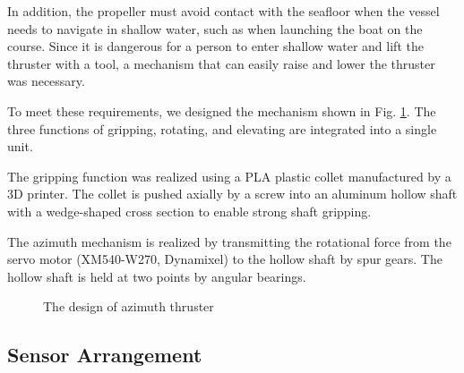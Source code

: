 \documentclass[lettersize,journal]{IEEEtran}
\begin{document}
In addition, the propeller must avoid contact with the seafloor when the vessel needs to navigate in shallow water, such as when launching the boat on the course. Since it is dangerous for a person to enter shallow water and lift the thruster with a tool, a mechanism that can easily raise and lower the thruster was necessary.

To meet these requirements, we designed the mechanism shown in Fig. \ref{fig:azimuth_design}.
The three functions of gripping, rotating, and elevating are integrated into a single unit.

The gripping function was realized using a PLA plastic collet manufactured by a 3D printer.
The collet is pushed axially by a screw into an aluminum hollow shaft with a wedge-shaped cross section to enable strong shaft gripping.

The azimuth mechanism is realized by transmitting the rotational force from the servo motor (XM540-W270, Dynamixel) to the hollow shaft by spur gears.
The hollow shaft is held at two points by angular bearings.

\begin{figure}[H]
  \begin{center}
  \end{center}
  \caption{The design of azimuth thruster}
  \label{fig:azimuth_design}
\end{figure}

\subsection{Sensor Arrangement}
\end{document}
